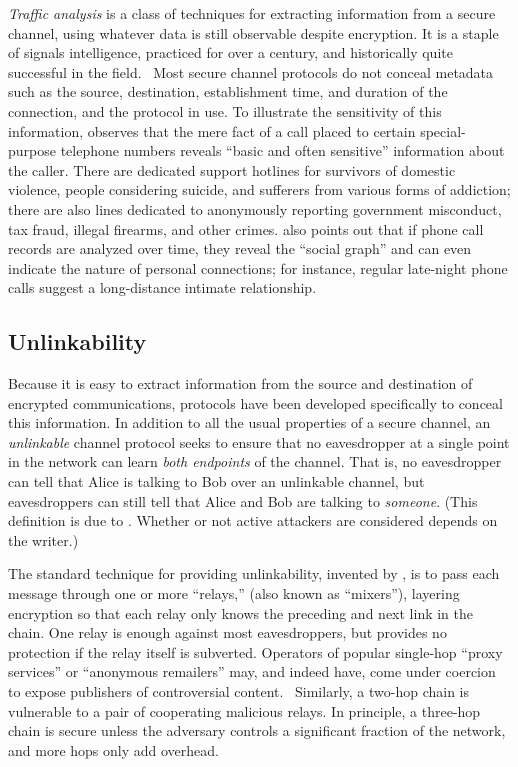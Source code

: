 \documentclass{zarticle}
\begin{document}
\emph{Traffic analysis} is a class of techniques for extracting
information from a secure channel, using whatever data is still
observable despite encryption.  It is a staple of signals
intelligence, practiced for over a century, and historically quite
successful in the field.~\cite{kahn1967codebreakers} Most secure
channel protocols do not conceal metadata such as the source,
destination, establishment time, and duration of the connection, and
the protocol in use.  To illustrate the sensitivity of this
information, \textcite{felten2013decl} observes that the mere fact of
a call placed to certain special-purpose telephone numbers reveals
“basic and often sensitive” information about the caller.  There are
dedicated support hotlines for survivors of domestic violence, people
considering suicide, and sufferers from various forms of addiction;
there are also lines dedicated to anonymously reporting government
misconduct, tax fraud, illegal firearms, and other crimes.
\citeauthor{felten2013decl} also points out that if phone call records
are analyzed over time, they reveal the “social graph” and can even
indicate the nature of personal connections; for instance, regular
late-night phone calls suggest a long-distance intimate relationship.

\subsection{Unlinkability}

Because it is easy to extract information from the source and
destination of encrypted communications, protocols have been developed
specifically to conceal this information.  In addition to all the usual
properties of a secure channel, an \emph{unlinkable} channel protocol
seeks to ensure that no eavesdropper at a single point in the network
can learn \emph{both endpoints} of the channel.  That is, no
eavesdropper can tell that Alice is talking to Bob over an unlinkable
channel, but eavesdroppers can still tell that Alice and Bob are
talking to \emph{someone}.  (This definition is due to
\textcite{pfitzmann2010terminology}.  Whether or not active attackers
are considered depends on the writer.)

The standard technique for providing unlinkability, invented by
\textcite{chaum1981mix}, is to pass each message through one or more
“relays,” (also known as “mixers”), layering encryption so that each
relay only knows the preceding and next link in the chain. One relay
is enough against most eavesdroppers, but provides no protection if
the relay itself is subverted.  Operators of popular single-hop “proxy
services” or “anonymous remailers” may, and indeed have, come under
coercion to expose publishers of controversial
content.~\cite{newman1996church, singel2007hushmail,
  ackerman2013lavabit} Similarly, a two-hop chain is vulnerable to a
pair of cooperating malicious relays.  In principle, a three-hop chain
is secure unless the adversary controls a significant fraction of the
network, and more hops only add overhead.~\cite{wright2002analysis,
  wright2003defending}
\end{document}
